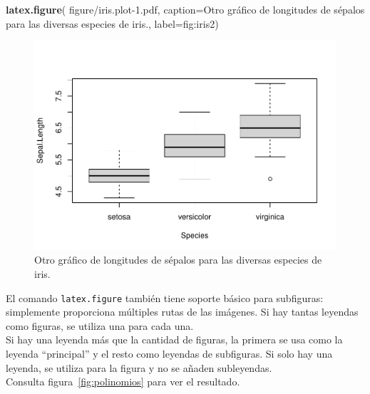 \documentclass[a4paper,conference]{IEEEtran}
\newenvironment{Shaded}{\begin{snugshade}}{\end{snugshade}}
\newcommand{\AttributeTok}[1]{\textcolor[rgb]{0.13,0.29,0.53}{#1}}
\newcommand{\FunctionTok}[1]{\textcolor[rgb]{0.13,0.29,0.53}{\textbf{#1}}}
\newcommand{\NormalTok}[1]{#1}
\newcommand{\StringTok}[1]{\textcolor[rgb]{0.31,0.60,0.02}{#1}}
\begin{document}
\begin{Shaded}
\begin{Highlighting}[]
\FunctionTok{latex.figure}\NormalTok{(}
  \StringTok{\textquotesingle{}figure/iris.plot{-}1.pdf\textquotesingle{}}\NormalTok{,}
  \AttributeTok{caption=}\StringTok{\textquotesingle{}Otro gráfico de longitudes de sépalos}
\StringTok{           para las diversas especies de iris.\textquotesingle{}}\NormalTok{,}
  \AttributeTok{label=}\StringTok{\textquotesingle{}fig:iris2\textquotesingle{}}\NormalTok{)}
\end{Highlighting}
\end{Shaded}

\begin{figure}[!t]%
\centering%
\includegraphics[width=\columnwidth]{figure/iris.plot-1.pdf}%
\caption{Otro gráfico de longitudes de sépalos
           para las diversas especies de iris.}%
\label{fig:iris2}%
\end{figure}

El comando \texttt{latex.figure} también tiene soporte básico para
subfiguras: simplemente proporciona múltiples rutas de las imágenes. Si
hay tantas leyendas como figuras, se utiliza una para cada una.\\
Si hay una leyenda más que la cantidad de figuras, la primera se usa
como la leyenda ``principal'' y el resto como leyendas de subfiguras. Si
solo hay una leyenda, se utiliza para la figura y no se añaden
subleyendas.\\
Consulta figura~\ref{fig:polinomios} para ver el resultado.
\end{document}

